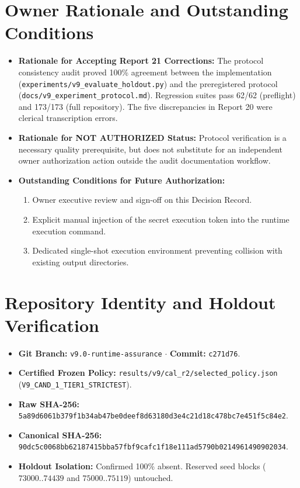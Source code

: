 \documentclass[10pt,a4paper]{article}
\begin{document}
\section{Owner Rationale and Outstanding Conditions}
\begin{itemize}
    \item \textbf{Rationale for Accepting Report 21 Corrections:} The protocol consistency audit proved 100\% agreement between the implementation (\texttt{experiments/v9\_evaluate\_holdout.py}) and the preregistered protocol (\texttt{docs/v9\_experiment\_protocol.md}). Regression suites pass 62/62 (preflight) and 173/173 (full repository). The five discrepancies in Report 20 were clerical transcription errors.
    \item \textbf{Rationale for NOT AUTHORIZED Status:} Protocol verification is a necessary quality prerequisite, but does not substitute for an independent owner authorization action outside the audit documentation workflow.
    \item \textbf{Outstanding Conditions for Future Authorization:}
    \begin{enumerate}
        \item Owner executive review and sign-off on this Decision Record.
        \item Explicit manual injection of the secret execution token into the runtime execution command.
        \item Dedicated single-shot execution environment preventing collision with existing output directories.
    \end{enumerate}
\end{itemize}

\section{Repository Identity and Holdout Verification}
\begin{itemize}
    \item \textbf{Git Branch:} \texttt{v9.0-runtime-assurance} $\cdot$ \textbf{Commit:} \texttt{c271d76}.
    \item \textbf{Certified Frozen Policy:} \texttt{results/v9/cal\_r2/selected\_policy.json} (\texttt{V9\_CAND\_1\_TIER1\_STRICTEST}).
    \item \textbf{Raw SHA-256:} \texttt{5a89d6061b379f1b34ab47be0deef8d63180d3e4c21d18c478bc7e451f5c84e2}.
    \item \textbf{Canonical SHA-256:} \texttt{90dc5c0068bb62187415bba57fbf9cafc1f18e111ad5790b0214961490902034}.
    \item \textbf{Holdout Isolation:} Confirmed 100\% absent. Reserved seed blocks ($73000..74439$ and $75000..75119$) untouched.
\end{itemize}
\end{document}
